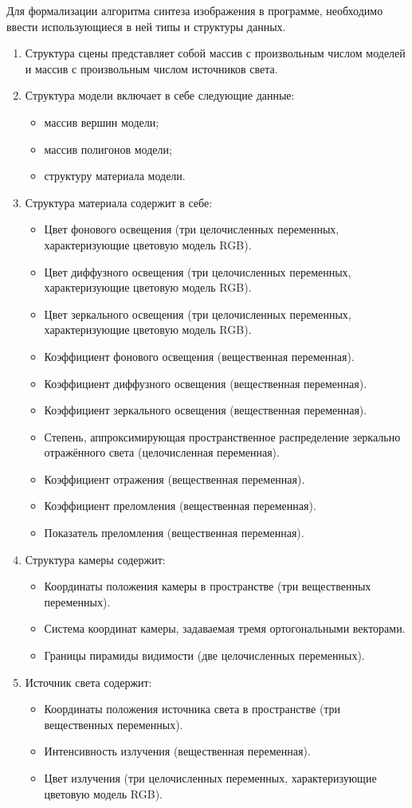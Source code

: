 Для формализации алгоритма синтеза изображения в программе, необходимо ввести использующиеся в ней типы и структуры данных.
\begin{enumerate}[label=\arabic*)]
	\item Структура сцены представляет собой массив с произвольным числом моделей и массив с произвольным числом источников света.
	\item Структура модели включает в себе следующие данные:
	\begin{itemize}
		\item массив вершин модели;
		\item массив полигонов модели;
		\item структуру материала модели.
	\end{itemize}
	\item Структура материала содержит в себе:
	\begin{itemize}
		\item Цвет фонового освещения (три целочисленных переменных, характеризующие цветовую модель RGB).
		\item Цвет диффузного освещения (три целочисленных переменных, характеризующие цветовую модель RGB).
		\item Цвет зеркального освещения (три целочисленных переменных, характеризующие цветовую модель RGB).
		\item Коэффициент фонового освещения (вещественная переменная).
		\item Коэффициент диффузного освещения (вещественная переменная).
		\item Коэффициент зеркального освещения (вещественная переменная).
		\item Степень, аппроксимирующая пространственное распределение зеркально отражённого света (целочисленная переменная).
		\item Коэффициент отражения (вещественная переменная).
		\item Коэффициент преломления (вещественная переменная).
		\item Показатель преломления (вещественная переменная).
	\end{itemize}
	\item Структура камеры содержит:
	\begin{itemize}
		\item Координаты положения камеры в пространстве (три вещественных переменных).
		\item Система координат камеры, задаваемая тремя ортогональными векторами.
		\item Границы пирамиды видимости (две целочисленных переменных).
	\end{itemize}
	\item Источник света содержит:
	\begin{itemize}
		\item Координаты положения источника света в пространстве (три вещественных переменных).
		\item Интенсивность излучения (вещественная переменная).
		\item Цвет излучения (три целочисленных переменных, характеризующие цветовую модель RGB).
	\end{itemize}
\end{enumerate}

